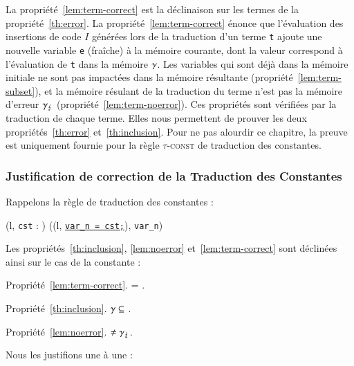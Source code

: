 La propriété~\ref{lem:term-correct} est la déclinaison sur les termes de la
propriété~\ref{th:error}.
La propriété~\ref{lem:term-correct} énonce que l'évaluation des insertions de
code $I$ générées lors de la traduction d'un terme \lstinline't' ajoute une
nouvelle variable \lstinline'e' (fraîche) à la mémoire courante, dont la valeur
correspond à l'évaluation de \lstinline't' dans la mémoire $\gamma$.
Les variables qui sont déjà dans la mémoire initiale ne sont pas
impactées dans la mémoire résultante (propriété~\ref{lem:term-subset}), et
la mémoire résulant de la traduction du terme n'est pas la mémoire d'erreur
$\gamma_\lightning$ (propriété~\ref{lem:term-noerror}).
Ces propriétés sont vérifiées par la traduction de chaque terme.
Elles nous permettent de prouver les deux propriétés~\ref{th:error}
et~\ref{th:inclusion}.
Pour ne pas alourdir ce chapitre, la preuve est uniquement fournie pour la règle
\textsc{$\tau$-const} de traduction des constantes.


\subsubsection{Justification de correction de la Traduction des Constantes}

Rappelons la règle de traduction des constantes :

{
  { (l, \mbox{\lstinline'cst'} : ) 
    ((l, \Zinit\underline{\mbox{\lstinline'var_n = cst;'}}),
    \mbox{\lstinline'var_n'}) }
}

Les propriétés~\ref{th:inclusion}, \ref{lem:noerror} et~\ref{lem:term-correct}
sont déclinées ainsi sur le cas de la constante :

Propriété~\ref{lem:term-correct}.  =
.


Propriété~\ref{th:inclusion}. $\gamma \subseteq$
.


Propriété~\ref{lem:noerror}.
$\neq \gamma_\lightning$.

Nous les justifions une à une :

